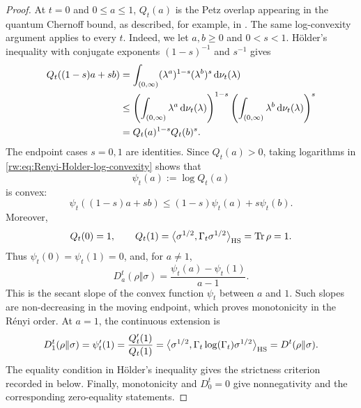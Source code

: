 \documentclass[11pt]{article}
\theoremstyle{remark}
\newcommand{\1}{\mathbbm{1}}
\begin{document}
\begin{proof}
At $t=0$ and $0\leq a\leq1$, $Q_t(a)$ is the Petz overlap appearing
in the quantum Chernoff bound, as described, for example, in
\cite{audenaert2007discriminating}.  The same log-convexity argument
applies to every $t$.  Indeed, we let $a,b\geq0$ and $0<s<1$.  H\"older's
inequality with conjugate exponents $(1-s)^{-1}$ and $s^{-1}$ gives
\begin{align}
 Q_t((1-s)a+sb)
 &=\int_{(0,\infty)}
   (\lambda^a)^{1-s}(\lambda^b)^s\,
   \mathrm d\nu_t(\lambda)\notag\\
 &\leq
 \left(\int_{(0,\infty)}\lambda^a\,
   \mathrm d\nu_t(\lambda)\right)^{1-s}
 \left(\int_{(0,\infty)}\lambda^b\,
   \mathrm d\nu_t(\lambda)\right)^s\notag\\
 &=Q_t(a)^{1-s}Q_t(b)^s.
 \label{rw:eq:Renyi-Holder-log-convexity}
\end{align}
The endpoint cases $s=0,1$ are identities.  Since $Q_t(a)>0$, taking
logarithms in \eqref{rw:eq:Renyi-Holder-log-convexity} shows that
\begin{equation}
 \psi_t(a):=\log Q_t(a)
 \label{rw:eq:Renyi-log-moment}
\end{equation}
is convex:
\begin{equation}
 \psi_t((1-s)a+sb)
 \leq(1-s)\psi_t(a)+s\psi_t(b).
 \label{rw:eq:Renyi-log-moment-convexity}
\end{equation}
Moreover,
\begin{equation}
 Q_t(0)=1,
 \qquad
 Q_t(1)=
 \big\langle\sigma^{1/2},
 \Gamma_t\sigma^{1/2}\big\rangle_{\rm HS}
 =\operatorname{Tr}\rho=1.
 \label{rw:eq:Renyi-moment-zero-one}
\end{equation}
Thus $\psi_t(0)=\psi_t(1)=0$, and, for $a\ne1$,
\begin{equation}
 D_a^t(\rho\Vert\sigma)
 =\frac{\psi_t(a)-\psi_t(1)}{a-1}.
 \label{rw:eq:Renyi-as-secant-slope}
\end{equation}
This is the secant slope of the convex function $\psi_t$ between
$a$ and $1$.  Such slopes are non-decreasing in the moving endpoint,
which proves monotonicity in the R\'enyi order.  At $a=1$, the
continuous extension is
\begin{equation}
 \begin{aligned}
 D_1^t(\rho\Vert\sigma) =\psi_t'(1) =\frac{Q_t'(1)}{Q_t(1)} =\big\langle\sigma^{1/2},
 \Gamma_t\log(\Gamma_t)\sigma^{1/2}
 \big\rangle_{\rm HS}
 =D^t(\rho\Vert\sigma).
 \end{aligned}
 \label{rw:eq:Renyi-order-one-spectral-limit}
\end{equation}
The equality condition in H\"older's inequality gives the strictness
criterion recorded in  below.
Finally, monotonicity and $D_0^t=0$ give nonnegativity and the
corresponding zero-equality statements.


\end{proof}
\end{document}
